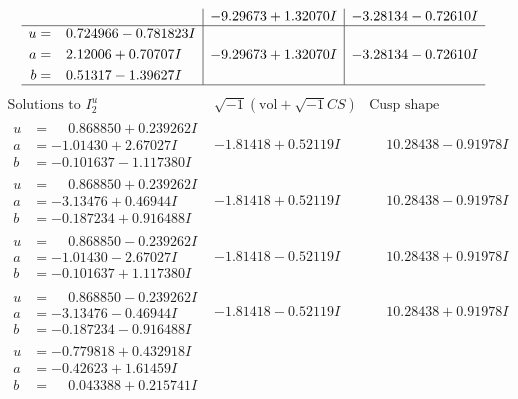 \documentclass[1p]{elsarticle_modified}
\theoremstyle{definition}
\newcommand{\I}{\sqrt{-1}}
\begin{document}
$$\begin{array}{c|c|c}
 & -9.29673 + 1.32070 I & -3.28134 - 0.72610 I \\ \hline\begin{aligned}
u &= \phantom{-}0.724966 - 0.781823 I \\
a &= \phantom{-}2.12006 + 0.70707 I \\
b &= \phantom{-}0.51317 - 1.39627 I\end{aligned}
 & -9.29673 + 1.32070 I & -3.28134 - 0.72610 I\\
 \hline 
 \end{array}$$\newpage$$\begin{array}{c|c|c}  
\text{Solutions to }I^u_{2}& \I (\text{vol} + \sqrt{-1}CS) & \text{Cusp shape}\\
 \hline 
\begin{aligned}
u &= \phantom{-}0.868850 + 0.239262 I \\
a &= -1.01430 + 2.67027 I \\
b &= -0.101637 - 1.117380 I\end{aligned}
 & -1.81418 + 0.52119 I & \phantom{-}10.28438 - 0.91978 I \\ \hline\begin{aligned}
u &= \phantom{-}0.868850 + 0.239262 I \\
a &= -3.13476 + 0.46944 I \\
b &= -0.187234 + 0.916488 I\end{aligned}
 & -1.81418 + 0.52119 I & \phantom{-}10.28438 - 0.91978 I \\ \hline\begin{aligned}
u &= \phantom{-}0.868850 - 0.239262 I \\
a &= -1.01430 - 2.67027 I \\
b &= -0.101637 + 1.117380 I\end{aligned}
 & -1.81418 - 0.52119 I & \phantom{-}10.28438 + 0.91978 I \\ \hline\begin{aligned}
u &= \phantom{-}0.868850 - 0.239262 I \\
a &= -3.13476 - 0.46944 I \\
b &= -0.187234 - 0.916488 I\end{aligned}
 & -1.81418 - 0.52119 I & \phantom{-}10.28438 + 0.91978 I \\ \hline\begin{aligned}
u &= -0.779818 + 0.432918 I \\
a &= -0.42623 + 1.61459 I \\
b &= \phantom{-}0.043388 + 0.215741 I\end{aligned}

\end{array}$$
\end{document}
